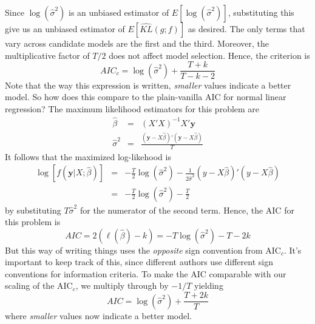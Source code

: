 \documentclass[12pt]{article}
\theoremstyle{definition}
\begin{document}
Since $\log(\widehat{\sigma}^2)$ is an unbiased estimator of $E[\log(\widehat{\sigma}^2)]$, substituting this give us an unbiased estimator of $E\left[\widehat{KL}(g;f) \right]$ as desired.
The only terms that vary across candidate models are the first and the third. Moreover, the multiplicative factor of $T/2$ does not affect model selection. Hence, the criterion is
$$AIC_c = \log(\widehat{\sigma}^2) + \frac{T + k}{T - k -2}$$
Note that the way this expression is written, \emph{smaller} values indicate a better model. So how does this compare to the plain-vanilla AIC for normal linear regression? The maximum likelihood estimators for this problem are
\begin{eqnarray*}
\widehat{\beta} &=& (X'X)^{-1}X'\mathbf{y}\\
\widehat{\sigma}^2 &=& \frac{(\mathbf{y} - X\widehat{\beta})'(\mathbf{y} - X\widehat{\beta})}{T}
\end{eqnarray*}
It follows that the maximized log-likehood is
\begin{eqnarray*}
\log\left[f(\mathbf{y}|X;\widehat{\beta})\right] &=& -\frac{T}{2} \log(\widehat{\sigma}^2) - \frac{1}{2\widehat{\sigma}^2}(y - X\widehat{\beta})'(y -X\widehat{\beta})\\
&=& -\frac{T}{2} \log(\widehat{\sigma}^2) - \frac{T}{2}
\end{eqnarray*}
by substituting $T\widehat{\sigma}^2$ for the numerator of the second term. Hence, the AIC for this problem is
$$AIC = 2\left(\ell(\widehat{\beta}) - k \right) = -T\log(\widehat{\sigma}^2) - T - 2k $$
But this way of writing things uses the \emph{opposite} sign convention from AIC$_c$. It's important to keep track of this, since different authors use different sign conventions for information criteria. To make the AIC comparable with our scaling of the AIC$_c$, we multiply through by $-1/T$ yielding
$$AIC = \log(\widehat{\sigma}^2) + \frac{T + 2k}{T}$$
where \emph{smaller} values now indicate a better model.
\end{document}
